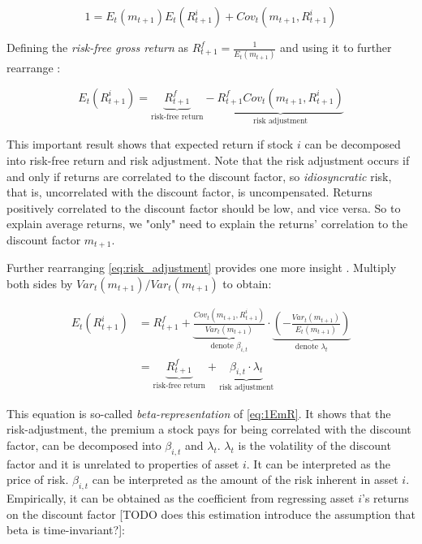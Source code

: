	 	\begin{equation}
	 		1 = E_t(m_{t+1}) E_t(R_{t+1}^i) + Cov_t(m_{t+1},R_{t+1}^i) 
	 	\end{equation} 
 	
 		Defining the \textit{risk-free gross return} as $R_{t+1}^f=\frac{1}{E_t(m_{t+1})}$ and using it to further rearrange \citep{cochrane2009asset}:
 		
 		\begin{equation}
 			E_t(R_{t+1}^i) = \underbrace{R_{t+1}^f}_\text{risk-free return}  -  \underbrace{R_{t+1}^f Cov_t(m_{t+1},R_{t+1}^i)}_\text{risk adjustment} \label{eq:risk_adjustment}
 		\end{equation} 
 		
 		This important result shows that expected return if stock $i$ can be decomposed into risk-free return and risk adjustment. Note that the risk adjustment occurs if and only if returns are correlated to the discount factor, so \textit{idiosyncratic} risk, that is, uncorrelated with the discount factor, is uncompensated. Returns positively correlated to the discount factor should be low, and vice versa. So to explain average returns, we "only" need to explain the returns' correlation to the discount factor $m_{t+1}$. 
 		
 		Further rearranging \ref{eq:risk_adjustment} provides one more insight \citep{cochrane2009asset}. Multiply both sides by $Var_t(m_{t+1})/Var_t(m_{t+1})$ to obtain:
 		
 		\begin{align}
	 		E_t(R_{t+1}^i) 
	 		& = {R_{t+1}^f} + 
	 		\underbrace{
	 			\frac{Cov_t(m_{t+1},R_{t+1}^i)}{Var_t(m_{t+1})}
	 			}_\text{denote $\beta_{i,t}$} 
 			\cdot 
 			\underbrace{
 				\left(-\frac{Var_t(m_{t+1})}{E_t(m_{t+1})}\right)
 				}_\text{denote $\lambda_{t}$} \label{eq:factor_model} \\
 			& = \underbrace{{R_{t+1}^f}
 				}_\text{risk-free return} 
 				+ 
 				\underbrace{\beta_{i,t} \cdot \lambda_{t}
 				}_\text{risk adjustment} \label{eq:beta_reprezentation}
 		\end{align} 
 		
 		This equation is so-called \textit{beta-representation} of \ref{eq:1EmR}. It shows that the risk-adjustment, the premium a stock pays for being correlated with the discount factor, can be decomposed into $\beta_{i,t}$ and $\lambda_t$. $\lambda_t$ is the volatility of the discount factor and it is unrelated to properties of asset $i$. It can be interpreted as the price of risk. $\beta_{i,t}$ can be interpreted as the amount of the risk inherent in asset $i$. Empirically, it can be obtained as the coefficient from regressing asset $i$'s returns on the discount factor [TODO does this estimation introduce the assumption that beta is time-invariant?]: 
 		

